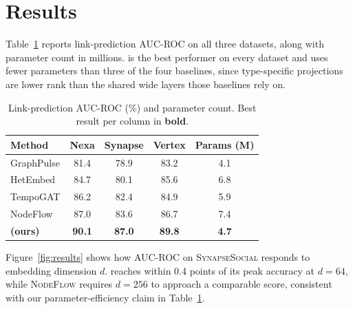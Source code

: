 \section{Results}
\label{sec:results}
Table~\ref{tab:results} reports link-prediction AUC-ROC on all three
datasets, along with parameter count in millions. \sysname{} is the best
performer on every dataset and uses fewer parameters than three of the four
baselines, since type-specific projections are lower rank than the shared
wide layers those baselines rely on.

\begin{table}[t]
\centering
\small
\caption{Link-prediction AUC-ROC (\%) and parameter count.
Best result per column in \textbf{bold}.}
\label{tab:results}
\begin{tabular}{lcccc}
\toprule
\rowcolor{kddblue!10}
Method & Nexa & Synapse & Vertex & Params (M) \\
\midrule
GraphPulse & 81.4 & 78.9 & 83.2 & 4.1 \\
HetEmbed   & 84.7 & 80.1 & 85.6 & 6.8 \\
TempoGAT   & 86.2 & 82.4 & 84.9 & 5.9 \\
NodeFlow   & 87.0 & 83.6 & 86.7 & 7.4 \\
\midrule
\textbf{\sysname{} (ours)} & \textbf{90.1} & \textbf{87.0} & \textbf{89.8} & \textbf{4.7} \\
\bottomrule
\end{tabular}
\end{table}

Figure~\ref{fig:results} shows how AUC-ROC on \textsc{SynapseSocial}
responds to embedding dimension $d$. \sysname{} reaches within 0.4 points
of its peak accuracy at $d=64$, while \textsc{NodeFlow} requires $d=256$ to
approach a comparable score, consistent with our parameter-efficiency claim
in Table~\ref{tab:results}.

